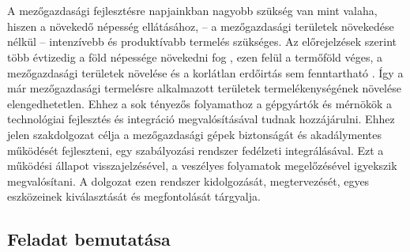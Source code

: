 \chapter{\bevezetes}

A mezőgazdasági fejlesztésre napjainkban nagyobb szükség van mint valaha, hiszen a növekedő népesség ellátásához, -- a mezőgazdasági területek növekedése nélkül -- intenzívebb és produktívabb termelés szükséges. Az előrejelzések szerint több évtizedig a föld népessége növekedni fog \cite{Lutz2010}, ezen felül a termőföld véges, a mezőgazdasági területek növelése és a korlátlan erdőirtás sem fenntartható \cite{Lawrence2014}. Így a már mezőgazdasági termelésre alkalmazott területek termelékenységének növelése elengedhetetlen. Ehhez a sok tényezős folyamathoz a gépgyártók és mérnökök a technológiai fejlesztés és integráció megvalósításával tudnak hozzájárulni.
Ehhez jelen szakdolgozat célja a mezőgazdasági gépek biztonságát és akadálymentes működését fejleszteni, egy szabályozási rendszer fedélzeti integrálásával. Ezt a működési állapot visszajelzésével, a veszélyes folyamatok megelőzésével igyekszik megvalósítani. A dolgozat ezen rendszer kidolgozását, megtervezését, egyes eszközeinek kiválasztását és megfontolását tárgyalja. 

\section{Feladat bemutatása}

